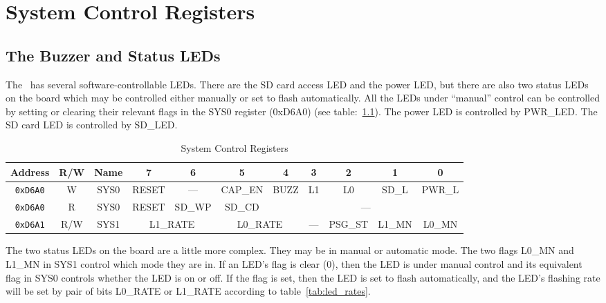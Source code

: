 \chapter{System Control Registers}
\label{sec:sysctrl}

\section*{The Buzzer and Status LEDs}

The \jr\ has several software-controllable LEDs. There are the SD card access LED and the power LED, but there are also two status LEDs on the board which may be controlled either manually or set to flash automatically. All the LEDs under ``manual'' control can be controlled by setting or clearing their relevant flags in the SYS0 register (0xD6A0) (see table:~\ref{tab:sys_ctrl_reg}). The power LED is controlled by PWR\_LED. The SD card LED is controlled by SD\_LED.

\begin{table}[ht]
    \begin{center}
        \begin{tabular}{|c|c|c|c|c|c|c|c|c|c|c|} \hline
            Address & R/W & Name & 7 & 6 & 5 & 4 & 3 & 2 & 1 & 0 \\\hline\hline

            \verb+0xD6A0+ & W & SYS0 & RESET & --- & CAP\_EN & BUZZ & L1 & L0 & SD\_L & PWR\_L \\ \hline
            \verb+0xD6A0+ & R & SYS0 & RESET & SD\_WP & SD\_CD & \multicolumn{5}{|c|}{---} \\ \hline
            \verb+0xD6A1+ & R/W & SYS1 & \multicolumn{2}{|c|}{L1\_RATE}
                                       & \multicolumn{2}{|c|}{L0\_RATE}
                                       & ---
                                       & PSG\_ST
                                       & L1\_MN & L0\_MN \\ \hline
        \end{tabular}
    \end{center}
    \caption{System Control Registers}
    \label{tab:sys_ctrl_reg}
\end{table}

The two status LEDs on the board are a little more complex. They may be in manual or automatic mode. The two flags L0\_MN and L1\_MN in SYS1 control which mode they are in. If an LED's flag is clear (0), then the LED is under manual control and its equivalent flag in SYS0 controls whether the LED is on or off. If the flag is set, then the LED is set to flash automatically, and the LED's flashing rate will be set by pair of bits L0\_RATE or L1\_RATE according to table~\ref{tab:led_rates}.


